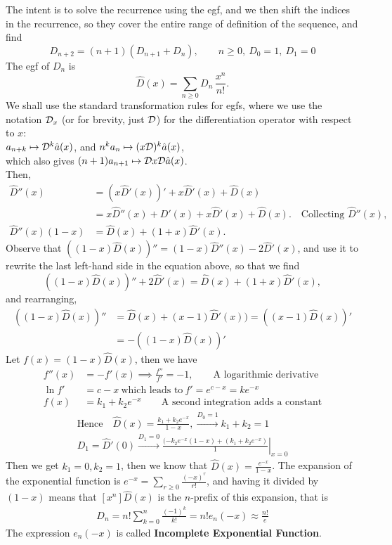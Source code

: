 \documentclass[11pt]{article}
\newcommand{\egfa}{{\sc egf}\xspace}
\newcommand{\lhs}{left-hand side\xspace}
\begin{document}
The intent is to solve the recurrence  using the \egfa, and we then shift the
indices in the recurrence, so they cover the entire range of definition of
the sequence, and find
\[
D_{n+2}=(n+1)(D_{n+1}+D_{n}), \qquad n\ge 0,~ D_0=1,~D_1=0
\]
The \egfa of $D_n$ is
\[
\hat{D}(x)=\sum_{n\ge 0}D_n\,\frac{x^n}{n!}.
\]
We shall use the standard transformation rules for \egfa{s}, where
we use the notation ${\mathcal D}_x$ (or for brevity, just ${\mathcal D}$) for the
differentiation operator with respect to $x$:\\
$a_{n+k} \mapsto {\mathcal D}^k\hat a(x)$, and
$n^k a_{n} \mapsto (x{\mathcal D})^k\hat a(x)$,\\
which also gives $(n+1) a_{n+1} \mapsto {\mathcal D} x{\mathcal D}\hat a(x)$.\\
Then, 
\begin{align*}
\hat{D}''(x)&=\left(x\hat{D}'(x)\right)'+x\hat{D}'(x)+\hat{D}(x)\\
&=x\hat{D}''(x)+D'(x)+x\hat{D}'(x)+\hat{D}(x).\quad \text{Collecting }
\hat D''(x),\\
\hat{D}''(x)(1-x)&=\hat{D}(x)+(1+x)\hat{D}'(x).
\end{align*}
Observe that $((1-x)\hat D(x))'' = (1-x)\hat D''(x) -2\hat D'(x)$, and use
it to rewrite the last \lhs in the equation above, so that we find
\[
\left((1-x)\hat{D}(x)\right)'' +2\hat D'(x) =\hat{D}(x)+(1+x)\hat{D}'(x),
\]
and rearranging,
\begin{align*}
\left((1-x)\hat{D}(x)\right)'' &= \hat{D}(x)+(x-1)\hat{D}'(x))
= \left((x-1)\hat{D}(x)\right)'\\
& =-\left((1-x)\hat{D}(x)\right)'
\end{align*}
Let $f(x)=(1-x)\hat{D}(x)$, then we have
\begin{align*}
f''(x)&=-f'(x) \implies \frac{f''}{f'}=-1, \qquad \text{A logarithmic
derivative}\\
\ln f'&=c-x~ \text{which leads to}~ f'=e^{c-x}=ke^{-x}\\
  f(x)&=k_1+k_2e^{-x} \qquad \text{A second integration adds a constant}
\end{align*}
\begin{align*}
\text{Hence}\quad
  \hat{D}(x)=\frac{k_1+k_2e^{-x}}{1-x}, \xrightarrow{D_0=1}k_1+k_2=1 \\
  D_1=\hat{D}'(0)\xrightarrow{D_1=0} 
  \left.\frac{(-k_2e^{-x}(1-x)+(k_1+k_2e^{-x})}{1}\right|_{x=0} 
\end{align*}
Then we get \(k_1=0, k_2=1\), then we know that
$\hat{D}(x)=\frac{e^{-x}}{1-x}$.  The expansion of the exponential
function is $e^{-x} =\sum_{r\geq 0}\frac{(-x)^r}{r!}$, and having it
divided by $(1-x)$ means that $[x^n]\hat D(x)$ is the $n$-prefix of this
expansion, that is
\begin{align*}
  D_n=n!\sum_{k=0}^n\frac{(-1)^k}{k!} = n!e_n(-x) \approx \frac{n!}{e}
\end{align*}
The expression $e_n(-x)$ is called \textbf{Incomplete Exponential
Function}.
\end{document}
